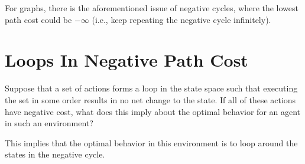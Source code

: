 \documentclass[12pt]{scrartcl}
\begin{document}
For graphs, there is the aforementioned issue of negative cycles, where the lowest path cost could be $-\infty$ (i.e., keep repeating the negative cycle infinitely).

\section{Loops In Negative Path Cost}
\begin{statement}
    Suppose that a set of actions forms a loop in the state space such that executing the set in some order results in no net change to the state. If all of these actions have negative cost, what does this imply about the optimal behavior for an agent in such an environment?
\end{statement}

This implies that the optimal behavior in this environment is to loop around the states in the negative cycle.
\end{document}
